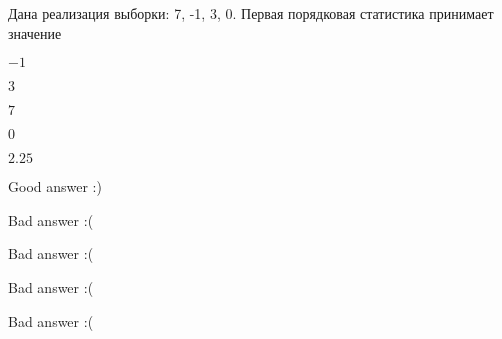 
\begin{question}
Дана реализация выборки: 7, -1, 3, 0. Первая порядковая статистика
принимает значение
\begin{answerlist}
  \item \(-1\)
  \item \(3\)
  \item \(7\)
  \item \(0\)
  \item \(2.25\)
\end{answerlist}
\end{question}

\begin{solution}
\begin{answerlist}
  \item Good answer :)
  \item Bad answer :(
  \item Bad answer :(
  \item Bad answer :(
  \item Bad answer :(
\end{answerlist}
\end{solution}

